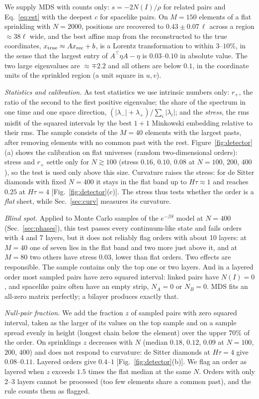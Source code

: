 \documentclass[prd,twocolumn,superscriptaddress,nofootinbib,amsmath,amssymb,floatfix]{revtex4-2}
\begin{document}
We supply MDS with counts only: $s=-2N(I)/\rho$ for related pairs and Eq.~\eqref{eq:est} with the deepest $c$ for spacelike pairs. On $M=150$ elements of a flat sprinkling with $N=2000$, positions are recovered to $0.43\pm0.07\,\ell$ across a region $\approx38\ell$ wide, and the best affine map from the reconstructed to the true coordinates, $x_{\rm true}\approx Ax_{\rm rec}+b$, is a Lorentz transformation to within $3$--$10\%$, in the sense that the largest entry of $A^{\top}\eta A-\eta$ is $0.03$--$0.10$ in absolute value. The two large eigenvalues are $\approx\mp2.2$ and all others are below $0.1$, in the coordinate units of the sprinkled region (a unit square in $u,v$).

\emph{Statistics and calibration.} As test statistics we use intrinsic numbers only: $r_+$, the ratio of the second to the first positive eigenvalue; the share of the spectrum in one time and one space direction, $(|\lambda_-|+\lambda_+)/\sum_i|\lambda_i|$; and the \emph{stress}, the rms misfit of the squared intervals by the best $1+1$ Minkowski embedding relative to their rms. The sample consists of the $M=40$ elements with the largest pasts, after removing elements with no common past with the rest. Figure~\ref{fig:detector}(a) shows the calibration on flat universes (random two-dimensional orders): stress and $r_+$ settle only for $N\gtrsim100$ (stress $0.16$, $0.10$, $0.08$ at $N=100$, $200$, $400$), so the test is used only above this size. Curvature raises the stress: for de Sitter diamonds with fixed $N=400$ it stays in the flat band up to $H\tau\approx1$ and reaches $0.25$ at $H\tau=4$ [Fig.~\ref{fig:detector}(c)]. The stress thus tests whether the order is a \emph{flat} sheet, while Sec.~\ref{sec:curv} measures its curvature.

\emph{Blind spot.} Applied to Monte Carlo samples of the $e^{-\beta S}$ model at $N=400$ (Sec.~\ref{sec:phases}), this test passes every continuum-like state and fails orders with 4 and 7 layers, but it does not reliably flag orders with about 10 layers: at $M=40$ one of seven lies in the flat band and two more just above it, and at $M=80$ two others have stress $0.03$, lower than flat orders. Two effects are responsible. The sample contains only the top one or two layers. And in a layered order most sampled pairs have zero squared interval: linked pairs have $N(I)=0$, and spacelike pairs often have an empty strip, $N_A=0$ or $N_B=0$. MDS fits an all-zero matrix perfectly; a bilayer produces exactly that.

\emph{Null-pair fraction.} We add the fraction $z$ of sampled pairs with zero squared interval, taken as the larger of its values on the top sample and on a sample spread evenly in height (longest chain below the element) over the upper $70\%$ of the order. On sprinklings $z$ decreases with $N$ (median $0.18$, $0.12$, $0.09$ at $N=100$, $200$, $400$) and does not respond to curvature: de Sitter diamonds at $H\tau=4$ give $0.08$--$0.11$. Layered orders give $0.4$--$1$ [Fig.~\ref{fig:detector}(b)]. We flag an order as layered when $z$ exceeds $1.5$ times the flat median at the same $N$. Orders with only 2--3 layers cannot be processed (too few elements share a common past), and the rule counts them as flagged.
\end{document}
